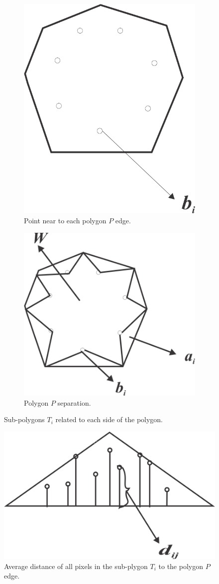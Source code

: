 \documentclass[11pt,leqno]{book}
\begin{document}
\begin{figure}[h!]
\centering
\begin{subfigure}{.5\textwidth}
  \centering
  \includegraphics[width=.5\linewidth]{pic04.png}
  \caption{Point near to each polygon $P$ edge.}
  \label{fig:sub5}
\end{subfigure}%
\begin{subfigure}{.5\textwidth}
  \centering
  \includegraphics[width=.6\linewidth]{pic05.png}
  \caption{Polygon $P$ separation.}
  \label{fig:sub6}
\end{subfigure}
\caption{Sub-polygons $T_i$ related to each side of the polygon.}
\label{fig:three}
\end{figure}

\begin{figure}[h!]
  \centering
  \includegraphics[width=.5\linewidth]{pic06.png}
  \caption{Average distance of all pixels in the sub-plygon $T_i$ to the polygon $P$ edge.}
\label{fig:four}
\end{figure}
\FloatBarrier
\end{document}
